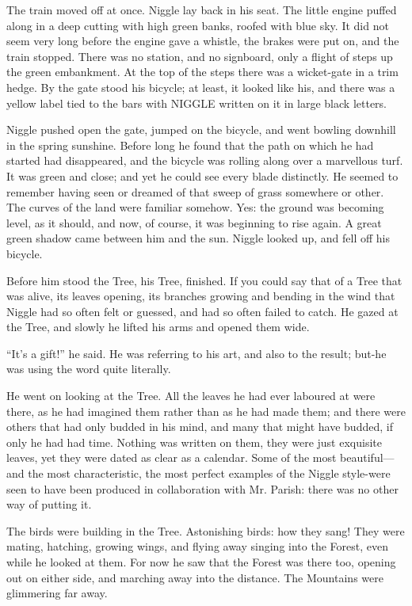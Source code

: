 \documentclass[english]{scrartcl}
\begin{document}
The train moved off at once. Niggle lay back in his seat. The little engine puffed along in a deep cutting with high green banks, roofed with blue sky. It did not seem very long before the engine gave a whistle, the brakes were put on, and the train stopped. There was no station, and no signboard, only a flight of steps up the green embankment. At the top of the steps there was a wicket-gate in a trim hedge. By the gate stood his bicycle; at least, it looked like his, and there was a yellow label tied to the bars with NIGGLE written on it in large black letters.

Niggle pushed open the gate, jumped on the bicycle, and went bowling downhill in the spring sunshine. Before long he found that the path on which he had started had disappeared, and the bicycle was rolling along over a marvellous turf. It was green and close; and yet he could see every blade distinctly. He seemed to remember having seen or dreamed of that sweep of grass somewhere or other. The curves of the land were familiar somehow. Yes: the ground was becoming level, as it should, and now, of course, it was beginning to rise again. A great green shadow came between him and the sun. Niggle looked up, and fell off his bicycle.

Before him stood the Tree, his Tree, finished. If you could say that of a Tree that was alive, its leaves opening, its branches growing and bending in the wind that Niggle had so often felt or guessed, and had so often failed to catch. He gazed at the Tree, and slowly he lifted his arms and opened them wide.

“It’s a gift!” he said. He was referring to his art, and also to the result; but-he was using the word quite literally.

He went on looking at the Tree. All the leaves he had ever laboured at were there, as he had imagined them rather than as he had made them; and there were others that had only budded in his mind, and many that might have budded, if only he had had time. Nothing was written on them, they were just exquisite leaves, yet they were dated as clear as a calendar. Some of the most beautiful—and the most characteristic, the most perfect examples of the Niggle style-were seen to have been produced in collaboration with Mr. Parish: there was no other way of putting it.

The birds were building in the Tree. Astonishing birds: how they sang! They were mating, hatching, growing wings, and flying away singing into the Forest, even while he looked at them. For now he saw that the Forest was there too, opening out on either side, and marching away into the distance. The Mountains were glimmering far away.
\end{document}
